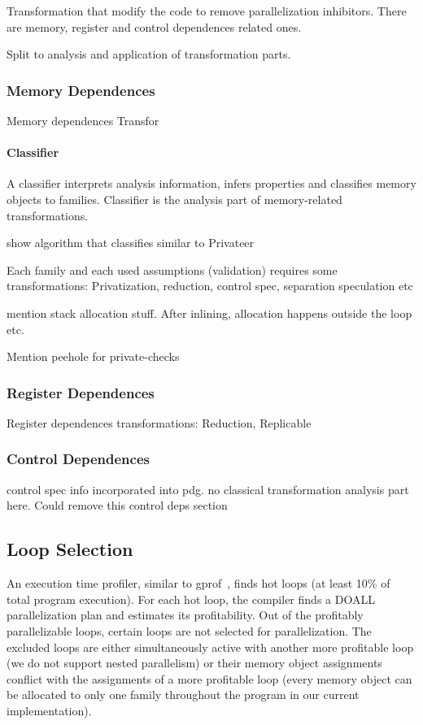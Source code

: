 Transformation that modify the code to remove parallelization inhibitors.
There are memory, register and control dependences related ones.

Split to analysis and application of transformation parts.

\subsubsection{Memory Dependences}

Memory dependences Transfor

\paragraph{Classifier}
A classifier interprets analysis information, infers properties and classifies memory objects to
families.
%
Classifier is the analysis part of memory-related transformations.

show algorithm that classifies similar to Privateer

Each family and each used assumptions (validation) requires some transformations:
Privatization, reduction, control spec, separation speculation etc


mention stack allocation stuff.
After inlining, allocation happens outside the loop etc.

Mention peehole for private-checks

\subsubsection{Register Dependences}

Register dependences transformations:
Reduction,
Replicable

\subsubsection{Control Dependences}

control spec info incorporated into pdg. no classical transformation analysis
part here. Could remove this control deps section

\subsection{Loop Selection} An execution time profiler, similar to
gprof~\cite{Privateer26}, finds hot loops (at least 10\% of total
program execution).
%
For each hot loop, the compiler finds a DOALL parallelization plan and
estimates its profitability.
%
Out of the profitably parallelizable loops, certain loops are not
selected for parallelization. The excluded loops are either
simultaneously active with another more profitable loop (we do not
support nested parallelism) or their memory object assignments
conflict with the assignments of a more profitable loop (every memory
object can be allocated to only one family throughout the program in
our current implementation).


